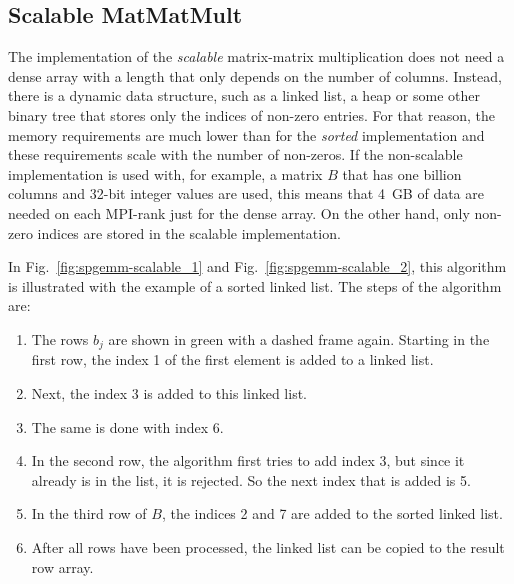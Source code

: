 \subsection{Scalable MatMatMult}
The implementation of the \textit{scalable} matrix-matrix multiplication does not need a dense array with a length that only depends on the number of columns. Instead, there is a dynamic data structure, such as a linked list, a heap or some other binary tree that stores only the indices of non-zero entries. For that reason, the memory requirements are much lower than for the \textit{sorted} implementation and these requirements scale with the number of non-zeros. If the non-scalable implementation is used with, for example, a matrix $B$ that has one billion columns and 32-bit integer values are used, this means that 4~GB of data are needed on each MPI-rank just for the dense array. On the other hand, only non-zero indices are stored in the scalable implementation.

In Fig.~\ref{fig:spgemm-scalable_1} and Fig.~\ref{fig:spgemm-scalable_2}, this algorithm is illustrated with the example of a sorted linked list. The steps of the algorithm are:
\vspace*{-15mm}
\begin{enumerate}[label=\alph*)]
\item The rows $b_j$ are shown in green with a dashed frame again. Starting in the first row, the index 1 of the first element is added to a linked list. 
\item Next, the index 3 is added to this linked list.
\item The same is done with index 6. 
\item In the second row, the algorithm first tries to add index 3, but since it already is in the list, it is rejected. So the next index that is added is 5. 
\item In the third row of $B$, the indices 2 and 7 are added to the sorted linked list.
\item After all rows have been processed, the linked list can be copied to the result row array.
\end{enumerate}


